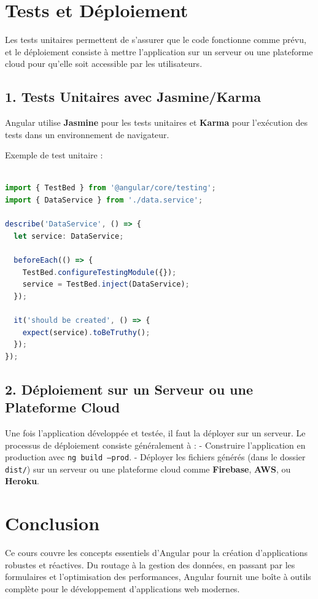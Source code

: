 \documentclass{article}
\begin{document}
\section*{Tests et Déploiement}

Les tests unitaires permettent de s’assurer que le code fonctionne comme prévu, et le déploiement consiste à mettre l'application sur un serveur ou une plateforme cloud pour qu'elle soit accessible par les utilisateurs.

\subsection*{1. Tests Unitaires avec Jasmine/Karma}

Angular utilise \textbf{Jasmine} pour les tests unitaires et \textbf{Karma} pour l’exécution des tests dans un environnement de navigateur.

Exemple de test unitaire :
\begin{lstlisting}[language=TypeScript, caption={Using a service in a component}, label={lst:typescript-service-usage}]

import { TestBed } from '@angular/core/testing';
import { DataService } from './data.service';

describe('DataService', () => {
  let service: DataService;

  beforeEach(() => {
    TestBed.configureTestingModule({});
    service = TestBed.inject(DataService);
  });

  it('should be created', () => {
    expect(service).toBeTruthy();
  });
});
\end{lstlisting}

\subsection*{2. Déploiement sur un Serveur ou une Plateforme Cloud}

Une fois l’application développée et testée, il faut la déployer sur un serveur. Le processus de déploiement consiste généralement à :
- Construire l’application en production avec \texttt{ng build --prod}.
- Déployer les fichiers générés (dans le dossier \texttt{dist/}) sur un serveur ou une plateforme cloud comme \textbf{Firebase}, \textbf{AWS}, ou \textbf{Heroku}.

\section*{Conclusion}

Ce cours couvre les concepts essentiels d'Angular pour la création d'applications robustes et réactives. Du routage à la gestion des données, en passant par les formulaires et l'optimisation des performances, Angular fournit une boîte à outils complète pour le développement d'applications web modernes.
\end{document}

